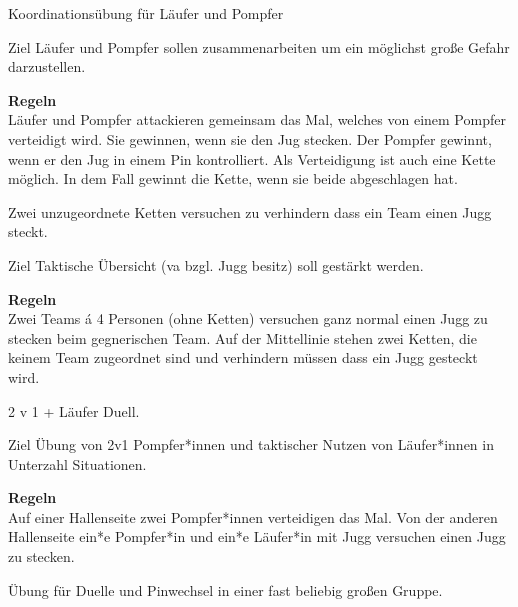 
Koordinationsübung für Läufer und Pompfer

\begin{bclogo}[logo=\bcoutil]{Ziel}
Läufer und Pompfer sollen zusammenarbeiten um ein möglichst große Gefahr darzustellen.
\end{bclogo}

\textbf{\large Regeln}\\
Läufer und Pompfer attackieren gemeinsam das Mal, welches von einem Pompfer verteidigt wird. Sie gewinnen, wenn sie den Jug stecken. Der Pompfer gewinnt, wenn er den Jug in einem Pin kontrolliert. Als Verteidigung ist auch eine Kette möglich. In dem Fall gewinnt die Kette, wenn sie beide abgeschlagen hat.


Zwei unzugeordnete Ketten versuchen zu verhindern dass ein Team einen Jugg steckt. 


\begin{bclogo}[logo=\bcoutil]{Ziel}
Taktische Übersicht (va bzgl. Jugg besitz) soll gestärkt werden. 
\end{bclogo}

\textbf{\large Regeln}\\
Zwei Teams á 4 Personen (ohne Ketten) versuchen ganz normal einen Jugg zu stecken beim gegnerischen Team. Auf der Mittellinie stehen zwei Ketten, die keinem Team zugeordnet sind und verhindern müssen dass ein Jugg gesteckt wird. 




2 v 1 + Läufer Duell. 


\begin{bclogo}[logo=\bcoutil]{Ziel}
Übung von 2v1 Pompfer*innen und taktischer Nutzen von Läufer*innen in Unterzahl Situationen. 
\end{bclogo}

\textbf{\large Regeln}\\
Auf einer Hallenseite zwei Pompfer*innen verteidigen das Mal. Von der anderen Hallenseite ein*e Pompfer*in und ein*e Läufer*in mit Jugg versuchen einen Jugg zu stecken.

\newpage


Übung für Duelle und Pinwechsel in einer fast beliebig großen Gruppe.

